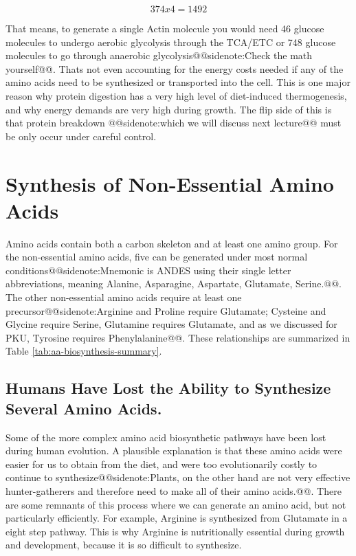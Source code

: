 \documentclass{tufte-handout}
\makeatletter
\def\sidenote#1{@@sidenote:#1@@}
\makeatother
\begin{document}
\begin{equation}
374 x 4 = 1492 
\end{equation}

That means, to generate a single Actin molecule you would need 46 glucose molecules to undergo aerobic glycolysis through the TCA/ETC or 748 glucose molecules to go through anaerobic glycolysis\sidenote{Check the math yourself}. Thats not even accounting for the energy costs needed if any of the  amino acids need to be synthesized or transported into the cell.  This is one major reason why protein digestion has a very high level of diet-induced thermogenesis, and why energy demands are very high during growth.  The flip side of this is that protein breakdown \sidenote{which we will discuss next lecture} must be only occur under careful control.

\section{Synthesis of Non-Essential Amino Acids}

Amino acids contain both a carbon skeleton and at least one amino group.  For the non-essential amino acids, five can be generated under most normal conditions\sidenote{Mnemonic is ANDES using their single letter abbreviations, meaning Alanine, Asparagine, Aspartate, Glutamate, Serine.}.  The other non-essential amino acids require at least one precursor\sidenote{Arginine and Proline require Glutamate; Cysteine and Glycine require Serine, Glutamine requires Glutamate, and as we discussed for PKU, Tyrosine requires Phenylalanine}.  These relationships are summarized in Table \ref{tab:aa-biosynthesis-summary}.

\subsection{Humans Have Lost the Ability to Synthesize Several Amino Acids.}  Some of the more complex amino acid biosynthetic pathways have been lost during human evolution.  A plausible explanation is that these amino acids were easier for us to obtain from the diet, and were too evolutionarily costly to continue to synthesize\sidenote{Plants, on the other hand are not very effective hunter-gatherers and therefore need to make all of their amino acids.}.  There are some remnants of this process where we can generate an amino acid, but not particularly efficiently.   For example, Arginine is synthesized from Glutamate in a eight step pathway.  This is why Arginine is nutritionally essential during growth and development, because it is so difficult to synthesize.
\end{document}
